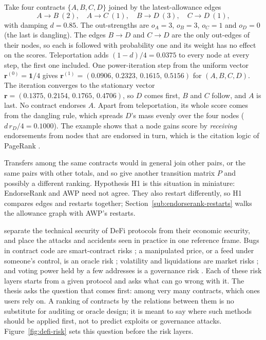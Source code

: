 Take four contracts $\{A,B,C,D\}$ joined by the latest-allowance edges
\[
A\to B\ (2),\quad A\to C\ (1),\quad B\to D\ (3),\quad C\to D\ (1),
\]
with damping $d=0.85$. The out-strengths are $o_A=3$, $o_B=3$, $o_C=1$ and $o_D=0$ (the last is dangling). The edges $B\to D$ and $C\to D$ are the only out-edges of their nodes, so each is followed with probability one and its weight has no effect on the scores. Teleportation adds $(1-d)/4=0.0375$ to every node at every step, the first one included. One power-iteration step from the uniform vector $\mathbf{r}^{(0)}=\mathbf{1}/4$ gives $\mathbf{r}^{(1)}=(0.0906,\,0.2323,\,0.1615,\,0.5156)$ for $(A,B,C,D)$. The iteration converges to the stationary vector $\mathbf{r}=(0.1375,\,0.2154,\,0.1765,\,0.4706)$, so $D$ comes first, $B$ and $C$ follow, and $A$ is last. No contract endorses $A$. Apart from teleportation, its whole score comes from the dangling rule, which spreads $D$'s mass evenly over the four nodes ($d\,r_D/4=0.1000$). The example shows that a node gains score by \emph{receiving} endorsements from nodes that are endorsed in turn, which is the citation logic of PageRank \parencite{page1999pagerank}.

Transfers among the same contracts would in general join other pairs, or the same pairs with other totals, and so give another transition matrix $P$ and possibly a different ranking. Hypothesis H1 is this situation in miniature: EndorseRank and AWP need not agree. They also restart differently, so H1 compares edges and restarts together; Section~\ref{sub:endorserank-restarts} walks the allowance graph with AWP's restarts.


\textcite{werner2022sok} separate the technical security of DeFi protocols from their economic security, and \textcite{zhou2023sok} place the attacks and accidents seen in practice in one reference frame. Bugs in contract code are smart-contract risks \parencite{li2022defisecurity}; a manipulated price, or a feed under someone's control, is an oracle risk \parencite{angeris2020oracles}; volatility and liquidations are market risks \parencite{perez2021liquidations}; and voting power held by a few addresses is a governance risk \parencite{fritsch2024voting}. Each of these risk layers starts from a given protocol and asks what can go wrong with it. The thesis asks the question that comes first: among very many contracts, which ones users rely on. A ranking of contracts by the relations between them is no substitute for auditing or oracle design; it is meant to say where such methods should be applied first, not to predict exploits or governance attacks. Figure~\ref{fig:defi-risk} sets this question before the risk layers.

